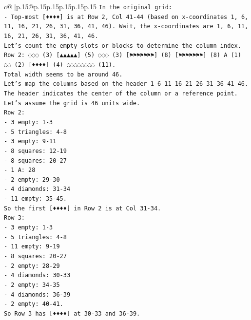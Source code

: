 \documentclass{article}
\begin{document}
{\begin{supertabular}{c@{$\;$}|p{.15\linewidth}@{}p{.15\linewidth}p{.15\linewidth}p{.15\linewidth}p{.15\linewidth}p{.15\linewidth}}
{{{\texttt{In the original grid:} \\
\texttt{{-} Top{-}most {[}♦♦♦♦{]} is at Row 2, Col 41{-}44 (based on x{-}coordinates 1, 6, 11, 16, 21, 26, 31, 36, 41, 46). Wait, the x{-}coordinates are 1, 6, 11, 16, 21, 26, 31, 36, 41, 46.} \\
\texttt{Let's count the empty slots or blocks to determine the column index.} \\
\texttt{Row 2: ◌◌◌ (3) {[}▲▲▲▲▲{]} (5) ◌◌◌ (3) {[}⚑⚑⚑⚑⚑⚑⚑{]} (8) {[}⚑⚑⚑⚑⚑⚑⚑{]} (8) A (1) ◌◌ (2) {[}♦♦♦♦{]} (4) ◌◌◌◌◌◌◌◌ (11).} \\
\texttt{Total width seems to be around 46.} \\
\texttt{Let's map the columns based on the header 1    6    11   16   21   26   31   36   41   46.} \\
\texttt{The header indicates the center of the column or a reference point.} \\
\texttt{Let's assume the grid is 46 units wide.} \\
\texttt{Row 2:} \\
\texttt{{-} 3 empty: 1{-}3} \\
\texttt{{-} 5 triangles: 4{-}8} \\
\texttt{{-} 3 empty: 9{-}11} \\
\texttt{{-} 8 squares: 12{-}19} \\
\texttt{{-} 8 squares: 20{-}27} \\
\texttt{{-} 1 A: 28} \\
\texttt{{-} 2 empty: 29{-}30} \\
\texttt{{-} 4 diamonds: 31{-}34} \\
\texttt{{-} 11 empty: 35{-}45.} \\
\texttt{So the first {[}♦♦♦♦{]} in Row 2 is at Col 31{-}34.} \\
\texttt{Row 3:} \\
\texttt{{-} 3 empty: 1{-}3} \\
\texttt{{-} 5 triangles: 4{-}8} \\
\texttt{{-} 11 empty: 9{-}19} \\
\texttt{{-} 8 squares: 20{-}27} \\
\texttt{{-} 2 empty: 28{-}29} \\
\texttt{{-} 4 diamonds: 30{-}33} \\
\texttt{{-} 2 empty: 34{-}35} \\
\texttt{{-} 4 diamonds: 36{-}39} \\
\texttt{{-} 2 empty: 40{-}41.} \\
\texttt{So Row 3 has {[}♦♦♦♦{]} at 30{-}33 and 36{-}39.} \\
}}}
\end{supertabular}}
\end{document}
